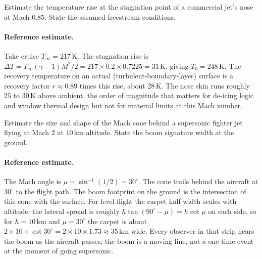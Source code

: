 \begin{exercise}
Estimate the temperature rise at the stagnation point of a
commercial jet's nose at Mach $0.85$. State the assumed
freestream conditions.
\paragraph{Reference estimate.} Take cruise $T_\infty = 217\,\si{
\kelvin}$. The stagnation rise is $\Delta T = T_\infty(\gamma -
1)M^2/2 = 217\times 0.2\times 0.7225 = 31\,\si{\kelvin}$, giving
$T_0 = 248\,\si{\kelvin}$. The recovery temperature on an actual
(turbulent-boundary-layer) surface is a recovery factor
$r \approx 0.89$ times this rise, about $28\,\si{\kelvin}$. The nose
skin runs roughly $25$ to $30\,\si{\kelvin}$ above ambient, the order
of magnitude that matters for de-icing logic and window thermal
design but not for material limits at this Mach number.
\end{exercise}

\begin{exercise}
Estimate the size and shape of the Mach cone behind a supersonic
fighter jet flying at Mach $2$ at $10\,\si{\kilo\meter}$ altitude.
State the boom signature width at the ground.
\paragraph{Reference estimate.} The Mach angle is $\mu =
\sin^{-1}(1/2) = 30^{\circ}$. The cone trails behind the aircraft at
$30^{\circ}$ to the flight path. The boom footprint on the ground is
the intersection of this cone with the surface. For level flight the
carpet half-width scales with altitude: the lateral spread is roughly
$h\tan(90^{\circ} - \mu) = h\cot\mu$ on each side, so for $h =
10\,\si{\kilo\meter}$ and $\mu = 30^{\circ}$ the carpet is about
$2\times 10\times\cot 30^{\circ} = 2\times 10\times 1.73 \approx
35\,\si{\kilo\meter}$ wide. Every observer in that strip hears the
boom as the aircraft passes; the boom is a moving line, not a
one-time event at the moment of going supersonic.
\end{exercise}

